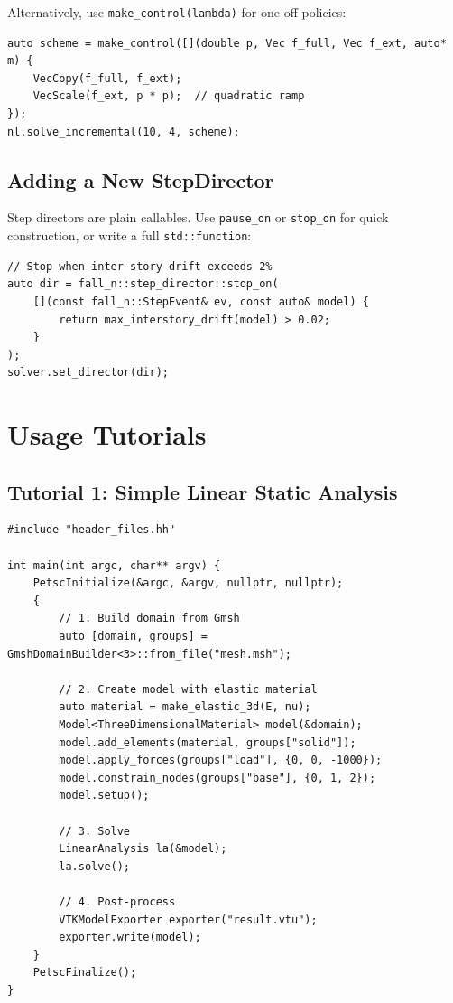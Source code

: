 \noindent
Alternatively, use \texttt{make\_control(lambda)} for one-off policies:

\begin{verbatim}
auto scheme = make_control([](double p, Vec f_full, Vec f_ext, auto* m) {
    VecCopy(f_full, f_ext);
    VecScale(f_ext, p * p);  // quadratic ramp
});
nl.solve_incremental(10, 4, scheme);
\end{verbatim}


\subsection{Adding a New StepDirector}
\label{sec:arch:ext:director}

Step directors are plain callables.  Use \texttt{pause\_on} or
\texttt{stop\_on} for quick construction, or write a full
\texttt{std::function}:

\begin{verbatim}
// Stop when inter-story drift exceeds 2%
auto dir = fall_n::step_director::stop_on(
    [](const fall_n::StepEvent& ev, const auto& model) {
        return max_interstory_drift(model) > 0.02;
    }
);
solver.set_director(dir);
\end{verbatim}


\section{Usage Tutorials}
\label{sec:arch:tutorials}


\subsection{Tutorial 1: Simple Linear Static Analysis}
\label{sec:arch:tut:linear}

\begin{verbatim}
#include "header_files.hh"

int main(int argc, char** argv) {
    PetscInitialize(&argc, &argv, nullptr, nullptr);
    {
        // 1. Build domain from Gmsh
        auto [domain, groups] = GmshDomainBuilder<3>::from_file("mesh.msh");

        // 2. Create model with elastic material
        auto material = make_elastic_3d(E, nu);
        Model<ThreeDimensionalMaterial> model(&domain);
        model.add_elements(material, groups["solid"]);
        model.apply_forces(groups["load"], {0, 0, -1000});
        model.constrain_nodes(groups["base"], {0, 1, 2});
        model.setup();

        // 3. Solve
        LinearAnalysis la(&model);
        la.solve();

        // 4. Post-process
        VTKModelExporter exporter("result.vtu");
        exporter.write(model);
    }
    PetscFinalize();
}
\end{verbatim}


